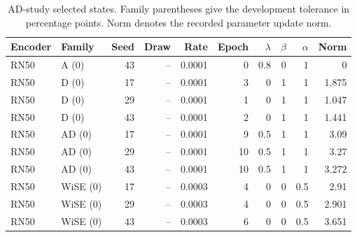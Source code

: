\begin{table}[t]
\centering
\scriptsize
\setlength{\tabcolsep}{3pt}
\begin{tabular}{llrrrrrrrr}
\toprule
Encoder & Family & Seed & Draw & Rate & Epoch & $\lambda$ & $\beta$ & $\alpha$ & Norm\\
\midrule
RN50 & A (0) & 43 & -- & 0.0001 & 0 & 0.8 & 0 & 1 & 0\\
RN50 & D (0) & 17 & -- & 0.0001 & 3 & 0 & 1 & 1 & 1.875\\
RN50 & D (0) & 29 & -- & 0.0001 & 1 & 0 & 1 & 1 & 1.047\\
RN50 & D (0) & 43 & -- & 0.0001 & 2 & 0 & 1 & 1 & 1.441\\
RN50 & AD (0) & 17 & -- & 0.0001 & 9 & 0.5 & 1 & 1 & 3.09\\
RN50 & AD (0) & 29 & -- & 0.0001 & 10 & 0.5 & 1 & 1 & 3.27\\
RN50 & AD (0) & 43 & -- & 0.0001 & 10 & 0.5 & 1 & 1 & 3.272\\
RN50 & WiSE (0) & 17 & -- & 0.0003 & 4 & 0 & 0 & 0.5 & 2.91\\
RN50 & WiSE (0) & 29 & -- & 0.0003 & 4 & 0 & 0 & 0.5 & 2.901\\
RN50 & WiSE (0) & 43 & -- & 0.0003 & 6 & 0 & 0 & 0.5 & 3.651\\
\bottomrule
\end{tabular}
\caption{AD-study selected states. Family parentheses give the development tolerance in percentage points. Norm denotes the recorded parameter update norm.}\label{tab:adselected80}
\end{table}



